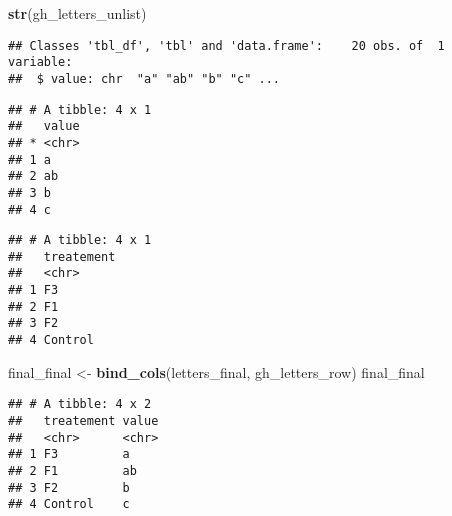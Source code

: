 \documentclass[]{book}
\newenvironment{Shaded}{\begin{snugshade}}{\end{snugshade}}
\newcommand{\DataTypeTok}[1]{\textcolor[rgb]{0.13,0.29,0.53}{#1}}
\newcommand{\KeywordTok}[1]{\textcolor[rgb]{0.13,0.29,0.53}{\textbf{#1}}}
\newcommand{\NormalTok}[1]{#1}
\newcommand{\OperatorTok}[1]{\textcolor[rgb]{0.81,0.36,0.00}{\textbf{#1}}}
\newcommand{\StringTok}[1]{\textcolor[rgb]{0.31,0.60,0.02}{#1}}
\theoremstyle{definition}
\theoremstyle{definition}
\theoremstyle{definition}
\theoremstyle{remark}
\begin{document}
\begin{Shaded}
\begin{Highlighting}[]
\KeywordTok{str}\NormalTok{(gh_letters_unlist)}
\end{Highlighting}
\end{Shaded}

\begin{verbatim}
## Classes 'tbl_df', 'tbl' and 'data.frame':    20 obs. of  1 variable:
##  $ value: chr  "a" "ab" "b" "c" ...
\end{verbatim}

\begin{Shaded}
\end{Shaded}

\begin{verbatim}
## # A tibble: 4 x 1
##   value
## * <chr>
## 1 a    
## 2 ab   
## 3 b    
## 4 c
\end{verbatim}

\begin{Shaded}
\end{Shaded}

\begin{verbatim}
## # A tibble: 4 x 1
##   treatement
##   <chr>     
## 1 F3        
## 2 F1        
## 3 F2        
## 4 Control
\end{verbatim}

\begin{Shaded}
\begin{Highlighting}[]
\NormalTok{final_final <-}\StringTok{ }\KeywordTok{bind_cols}\NormalTok{(letters_final, gh_letters_row)}
\NormalTok{final_final}
\end{Highlighting}
\end{Shaded}

\begin{verbatim}
## # A tibble: 4 x 2
##   treatement value
##   <chr>      <chr>
## 1 F3         a    
## 2 F1         ab   
## 3 F2         b    
## 4 Control    c
\end{verbatim}
\end{document}
